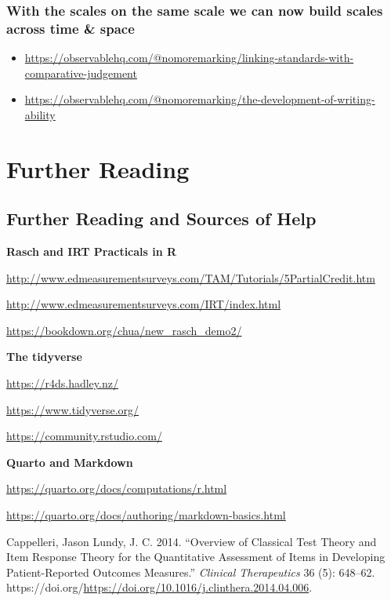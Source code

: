 \documentclass[
  letterpaper,
  DIV=11,
  numbers=noendperiod]{scrreprt}
\providecommand{\tightlist}{%
  \setlength{\itemsep}{0pt}\setlength{\parskip}{0pt}}\usepackage{longtable,booktabs,array}
\newlength{\cslhangindent}
\newlength{\cslentryspacingunit} %
\newenvironment{CSLReferences}[2] %
 {%
  \setlength{\parindent}{0pt}
  \ifodd #1
  \let\oldpar\par
  \def\par{\hangindent=\cslhangindent\oldpar}
  \fi
  \setlength{\parskip}{#2\cslentryspacingunit}
 }%
 {}
\begin{document}
\hypertarget{with-the-scales-on-the-same-scale-we-can-now-build-scales-across-time-space}{%
\section{With the scales on the same scale we can now build scales
across time \&
space}\label{with-the-scales-on-the-same-scale-we-can-now-build-scales-across-time-space}}

\begin{itemize}
\tightlist
\item
  \url{https://observablehq.com/@nomoremarking/linking-standards-with-comparative-judgement}
\item
  \url{https://observablehq.com/@nomoremarking/the-development-of-writing-ability}
\end{itemize}

\part{Further Reading}

\hypertarget{further-reading-and-sources-of-help}{%
\chapter{Further Reading and Sources of
Help}\label{further-reading-and-sources-of-help}}

\textbf{Rasch and IRT Practicals in R}

\url{http://www.edmeasurementsurveys.com/TAM/Tutorials/5PartialCredit.htm}

\url{http://www.edmeasurementsurveys.com/IRT/index.html}

\url{https://bookdown.org/chua/new_rasch_demo2/}

\textbf{The tidyverse}

\url{https://r4ds.hadley.nz/}

\url{https://www.tidyverse.org/}

\url{https://community.rstudio.com/}

\textbf{Quarto and Markdown}

\url{https://quarto.org/docs/computations/r.html}

\url{https://quarto.org/docs/authoring/markdown-basics.html}

\hypertarget{refs}{}
\begin{CSLReferences}{1}{0}
\leavevmode{}%
Cappelleri, Jason Lundy, J. C. 2014. {``Overview of Classical Test
Theory and Item Response Theory for the Quantitative Assessment of Items
in Developing Patient-Reported Outcomes Measures.''} \emph{Clinical
Therapeutics} 36 (5): 648--62.
https://doi.org/\url{https://doi.org/10.1016/j.clinthera.2014.04.006}.

\end{CSLReferences}
\end{document}
